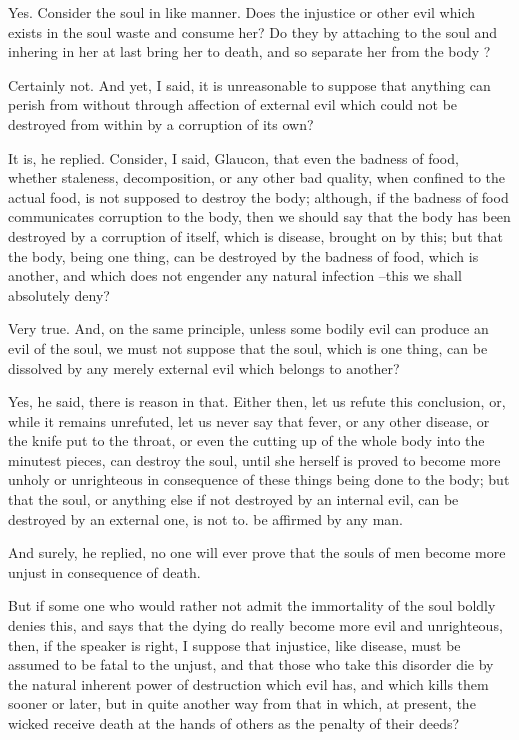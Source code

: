 Yes.
Consider the soul in like manner. Does the injustice or other evil which exists in the soul waste and consume her? Do they by attaching to the soul and inhering in her at last bring her to death, and so separate her from the body ?

Certainly not.
And yet, I said, it is unreasonable to suppose that anything can perish from without through affection of external evil which could not be destroyed from within by a corruption of its own?

It is, he replied.
Consider, I said, Glaucon, that even the badness of food, whether staleness, decomposition, or any other bad quality, when confined to the actual food, is not supposed to destroy the body; although, if the badness of food communicates corruption to the body, then we should say that the body has been destroyed by a corruption of itself, which is disease, brought on by this; but that the body, being one thing, can be destroyed by the badness of food, which is another, and which does not engender any natural infection --this we shall absolutely deny?

Very true.
And, on the same principle, unless some bodily evil can produce an evil of the soul, we must not suppose that the soul, which is one thing, can be dissolved by any merely external evil which belongs to another?

Yes, he said, there is reason in that.
Either then, let us refute this conclusion, or, while it remains unrefuted, let us never say that fever, or any other disease, or the knife put to the throat, or even the cutting up of the whole body into the minutest pieces, can destroy the soul, until she herself is proved to become more unholy or unrighteous in consequence of these things being done to the body; but that the soul, or anything else if not destroyed by an internal evil, can be destroyed by an external one, is not to. be affirmed by any man.

And surely, he replied, no one will ever prove that the souls of men become more unjust in consequence of death.

But if some one who would rather not admit the immortality of the soul boldly denies this, and says that the dying do really become more evil and unrighteous, then, if the speaker is right, I suppose that injustice, like disease, must be assumed to be fatal to the unjust, and that those who take this disorder die by the natural inherent power of destruction which evil has, and which kills them sooner or later, but in quite another way from that in which, at present, the wicked receive death at the hands of others as the penalty of their deeds?

